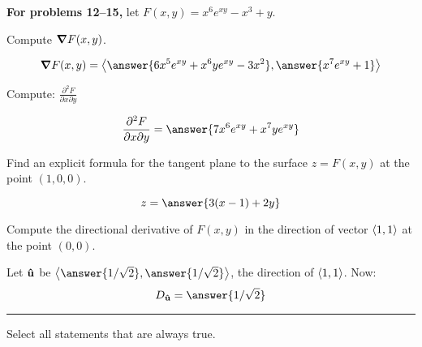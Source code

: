 \documentclass{ximera}
\author{Darry Andrews and Bart Snapp}
\begin{document}
\textbf{For problems 12--15,} let $F(x,y)=x^6 e^{xy} -x^3+y$.

\begin{problem}
  Compute $\boldsymbol\nabla F(x,y)$.
  \begin{prompt}
    \[
    \grad F(x,y) = \vector{\answer{6x^5e^{xy}+x^6 y e^{xy}-3x^2},\answer{x^7e^{xy}+1}}
    \]
  \end{prompt}
  \vfill
  
\end{problem}

\begin{problem}
  Compute: $\frac{\partial^2 F}{\partial x\partial y }$
  \begin{prompt}
    \[
    \frac{\partial^2 F}{\partial x\partial y } = \answer{7x^6 e^{xy} + x^7y e^{xy}}
    \]
  \end{prompt}
  \vfill

\end{problem}


\begin{problem}
  Find an explicit formula for the tangent plane to the surface $z =
  F(x,y)$ at the point $(1,0,0)$.
  \begin{prompt}
  \[
  z = \answer{3(x-1) + 2y}
  \]
  \end{prompt}

  \vfill

\end{problem}


\begin{problem}
  Compute the directional derivative of $F(x,y)$ in the direction of
  vector $\left\langle 1,1\right\rangle$ at the point $(0,0)$.
  \begin{prompt}
    Let $\mathbf{\hat{u}}$ be
    $\vector{\answer{1/\sqrt{2}},\answer{1/\sqrt{2}}}$, the direction
    of $\left\langle 1,1\right\rangle$. Now:
    \[
    D_{\uvec{u}} = \answer{1/\sqrt{2}}
    \]
  \end{prompt}

  \vfill
  
\end{problem}

\hrule

\begin{problem}
  \begin{prompt}
    Select all statements that are always true.
  \end{prompt}
  
  \begin{selectAll}
  \end{selectAll}
\end{problem}
\end{document}
